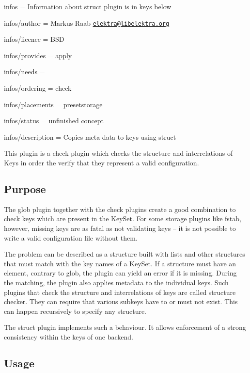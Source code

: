 
\begin{DoxyItemize}
\item infos = Information about struct plugin is in keys below
\item infos/author = Markus Raab \href{mailto:elektra@libelektra.org}{\tt elektra@libelektra.\+org}
\item infos/licence = B\+S\+D
\item infos/provides = apply
\item infos/needs =
\item infos/ordering = check
\item infos/placements = presetstorage
\item infos/status = unfinished concept
\item infos/description = Copies meta data to keys using struct
\end{DoxyItemize}

This plugin is a check plugin which checks the structure and interrelations of Keys in order the verify that they represent a valid configuration.

\subsection*{Purpose}

The glob plugin together with the check plugins create a good combination to check keys which are present in the Key\+Set. For some storage plugins like fstab, however, missing keys are as fatal as not validating keys – it is not possible to write a valid configuration file without them.

The problem can be described as a structure built with lists and other structures that must match with the key names of a Key\+Set. If a structure must have an element, contrary to glob, the plugin can yield an error if it is missing. During the matching, the plugin also applies metadata to the individual keys. Such plugins that check the structure and interrelations of keys are called structure checker. They can require that various subkeys have to or must not exist. This can happen recursively to specify any structure.

The struct plugin implements such a behaviour. It allows enforcement of a strong consistency within the keys of one backend.

\subsection*{Usage}

